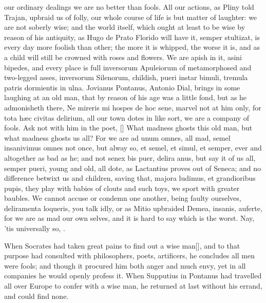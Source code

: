 {our ordinary dealings we are no better than fools. All our actions, as
Pliny told Trajan, upbraid us of folly, our whole course of life
is but matter of laughter: we are not soberly wise; and the world
itself, which ought at least to be wise by reason of his antiquity, as
Hugo de Prato Florido will have it, semper stultizat, is every day
more foolish than other; the more it is whipped, the worse it is, and
as a child will still be crowned with roses and flowers. We are apish
in it, asini bipedes, and every place is full inversorum Apuleiorum of
metamorphosed and two-legged asses, inversorum Silenorum, childish,
pueri instar bimuli, tremula patris dormientis in ulna. Jovianus
Pontanus, Antonio Dial, brings in some laughing at an old man, that by
reason of his age was a little fond, but as he admonisheth there, Ne
mireris mi hospes de hoc sene, marvel not at him only, for tota h\ae{}c
civitas delirium, all our town dotes in like sort, we are a
company of fools. Ask not with him in the poet, [\baselineskip] What madness ghosts this old
man, but what madness ghosts us all? For we are ad unum omnes, all mad,
semel insanivimus omnes not once, but alway so, et semel, et simul, et
semper, ever and altogether as bad as he; and not senex bis puer,
delira anus, but say it of us all, semper pueri, young and old, all
dote, as Lactantius proves out of Seneca; and no difference betwixt us
and children, saving that, majora ludimus, et grandioribus pupis, they
play with babies of clouts and such toys, we sport with greater
baubles. We cannot accuse or condemn one another, being faulty
ourselves, deliramenta loqueris, you talk idly, or as Mitio
upbraided Demea, insanis, auferte, for we are as mad our own selves,
and it is hard to say which is the worst. Nay, 'tis universally so,
.

When Socrates had taken great pains to find out a wise man[\baselineskip], and to
that purpose had consulted with philosophers, poets, artificers, he
concludes all men were fools; and though it procured him both anger and
much envy, yet in all companies he would openly profess it. When 
Supputius in Pontanus had travelled all over Europe to confer with a
wise man, he returned at last without his errand, and could find none.

}
